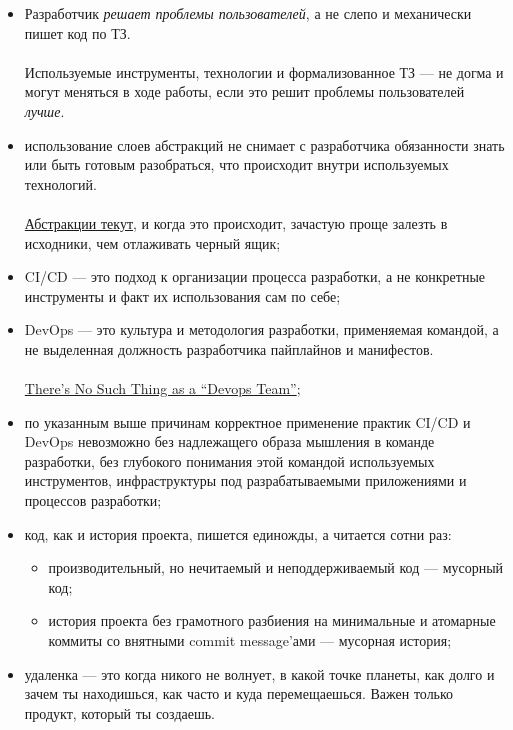 \documentclass[letterpaper, 11pt]{article}
\begin{document}
    \begin{itemize}
        \item
            Разработчик \textit{решает проблемы пользователей}, а не слепо и механически пишет код по ТЗ.
            \\ \\
            Используемые инструменты, технологии и формализованное ТЗ --- не догма и могут меняться в ходе работы, если это решит проблемы пользователей \textit{лучше}.

        \item
            использование слоев абстракций не снимает с разработчика обязанности знать или быть готовым разобраться, что происходит внутри используемых технологий.
            \\ \\
            \href{https://www.joelonsoftware.com/2002/11/11/the-law-of-leaky-abstractions}{Абстракции текут}, и когда это происходит, зачастую проще залезть в исходники, чем отлаживать черный ящик;

        \item
            CI/CD --- это подход к организации процесса разработки, а не конкретные инструменты и факт их использования сам по себе;

        \item
            DevOps --- это культура и методология разработки, применяемая командой, а не выделенная должность разработчика пайплайнов и манифестов.
            \\ \\
            \href{https://continuousdelivery.com/2012/10/theres-no-such-thing-as-a-devops-team/}{There's No Such Thing as a ``Devops Team''};

        \item
            по указанным выше причинам корректное применение практик CI/CD и DevOps невозможно без надлежащего образа мышления в команде разработки, без глубокого понимания этой командой используемых инструментов, инфраструктуры под разрабатываемыми приложениями и процессов разработки;

        \item
            код, как и история проекта, пишется единожды, а читается сотни раз:

            \begin{itemize}
                \item
                производительный, но нечитаемый и неподдерживаемый код --- мусорный код;

                \item
                история проекта без грамотного разбиения на минимальные и атомарные коммиты со внятными commit message'ами --- мусорная история;
            \end{itemize}

        \item
            удаленка --- это когда никого не волнует, в какой точке планеты, как долго и зачем ты находишься, как часто и куда перемещаешься. Важен только продукт, который ты создаешь.
    \end{itemize}

    \renewcommand{\labelitemi}{\textbullet}
\end{document}
